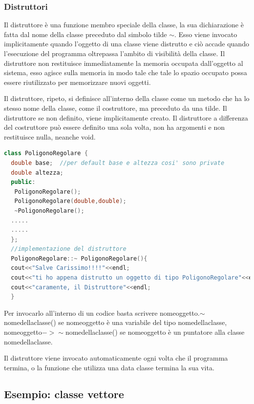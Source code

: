 \documentclass[11pt,fleqn]{book} %
\begin{document}
\subsubsection{Distruttori}

Il distruttore è una funzione membro speciale della classe, la sua dichiarazione è fatta dal nome della classe preceduto dal simbolo tilde $\sim$. Esso viene invocato implicitamente quando l'oggetto di una classe viene distrutto e ciò accade quando l'esecuzione del programma oltrepassa l'ambito di visibilità della classe. Il distruttore non restituisce immediatamente la memoria occupata dall'oggetto al sistema, esso agisce sulla memoria in modo tale che tale lo spazio occupato possa essere riutilizzato per memorizzare nuovi oggetti. 

Il distruttore, ripeto, si definisce all'interno della classe come un metodo che ha lo stesso nome della classe, come il costruttore, ma preceduto da una tilde.
Il distruttore se non definito, viene implicitamente creato.
Il distruttore a differenza del costruttore può essere definito una sola volta, non ha argomenti e non restituisce nulla, neanche void.

\begin{lstlisting}[language=c++]
class PoligonoRegolare {
  double base;  //per default base e altezza cosi' sono private
  double altezza;
  public:
   PoligonoRegolare();
   PoligonoRegolare(double,double);
   ~PoligonoRegolare();
  .....
  .....
  };
  //implementazione del distruttore
  PoligonoRegolare::~ PoligonoRegolare(){
  cout<<"Salve Carissimo!!!!"<<endl;
  cout<<"ti ho appena distrutto un oggetto di tipo PoligonoRegolare"<<endl;
  cout<<"caramente, il Distruttore"<<endl;
  }
  \end{lstlisting}

Per invocarlo all'interno di un codice basta scrivere nomeoggetto.$\sim$nomedellaclasse() se nomeoggetto è una variabile del tipo nomedellaclasse, nomeoggetto$->\sim$nomedellaclasse() se nomeoggetto è un puntatore alla classe nomedellaclasse.

Il distruttore viene invocato automaticamente ogni volta che il programma termina, o la funzione che utilizza una data classe termina la sua vita.


\subsection{Esempio: classe vettore}
\end{document}
